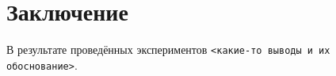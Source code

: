 \section{Заключение}

В результате проведённых экспериментов \texttt{<какие-то выводы и их обоснование>}.